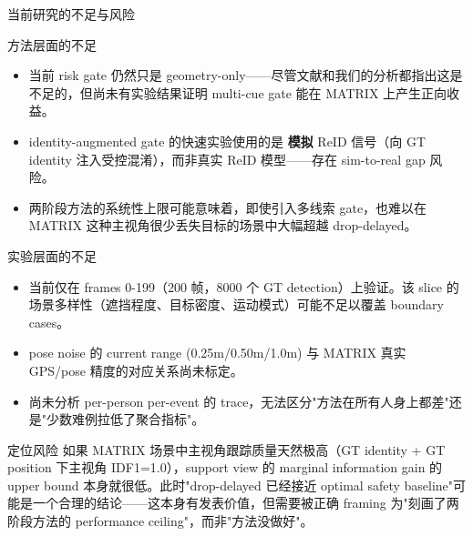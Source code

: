 \documentclass[aspectratio=169,xcolor=dvipsnames]{beamer}
\begin{document}
\begin{frame}{当前研究的不足与风险}
\small
\begin{block}{方法层面的不足}
\begin{itemize}
  \item 当前 risk gate 仍然只是 geometry-only——尽管文献和我们的分析都指出这是不足的，但尚未有实验结果证明 multi-cue gate 能在 MATRIX 上产生正向收益。
  \item identity-augmented gate 的快速实验使用的是 \textbf{模拟} ReID 信号（向 GT identity 注入受控混淆），而非真实 ReID 模型——存在 sim-to-real gap 风险。
  \item 两阶段方法的系统性上限可能意味着，即使引入多线索 gate，也难以在 MATRIX 这种主视角很少丢失目标的场景中大幅超越 drop-delayed。
\end{itemize}
\end{block}

\begin{block}{实验层面的不足}
\begin{itemize}
  \item 当前仅在 frames 0-199（200 帧，8000 个 GT detection）上验证。该 slice 的场景多样性（遮挡程度、目标密度、运动模式）可能不足以覆盖 boundary cases。
  \item pose noise 的 current range (0.25m/0.50m/1.0m) 与 MATRIX 真实 GPS/pose 精度的对应关系尚未标定。
  \item 尚未分析 per-person per-event 的 trace，无法区分"方法在所有人身上都差"还是"少数难例拉低了聚合指标"。
\end{itemize}
\end{block}

\begin{block}{定位风险}
如果 MATRIX 场景中主视角跟踪质量天然极高（GT identity + GT position 下主视角 IDF1=1.0），support view 的 marginal information gain 的 upper bound 本身就很低。此时"drop-delayed 已经接近 optimal safety baseline"可能是一个合理的结论——这本身有发表价值，但需要被正确 framing 为"刻画了两阶段方法的 performance ceiling"，而非"方法没做好"。
\end{block}
\end{frame}

\end{document}
